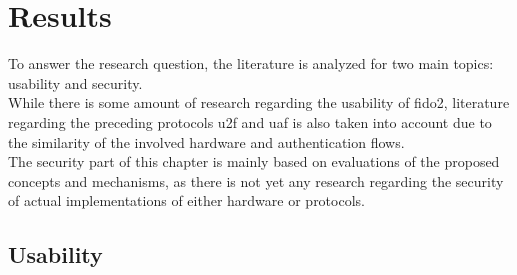 
\section{Results}
\label{sec:results}

To answer the research question, the literature is analyzed for two main topics: usability and security.\\
While there is some amount of research regarding the usability of \ac{fido2}, literature regarding the preceding protocols \ac{u2f} and \ac{uaf} is also taken into account due to the similarity of the involved hardware and authentication flows.\\
The security part of this chapter is mainly based on evaluations of the proposed concepts and mechanisms, as there is not yet any research regarding the security of actual implementations of either hardware or protocols.

\subsection{Usability}
\label{subsec:usability}

